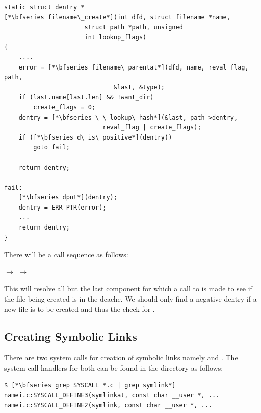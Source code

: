 \begin{lstlisting}
static struct dentry *
[*\bfseries filename\_create*](int dfd, struct filename *name,
                      struct path *path, unsigned 
                      int lookup_flags)
{    
    ....   
    error = [*\bfseries filename\_parentat*](dfd, name, reval_flag, path, 
                              &last, &type);
    if (last.name[last.len] && !want_dir)
        create_flags = 0;
    dentry = [*\bfseries \_\_lookup\_hash*](&last, path->dentry, 
                           reval_flag | create_flags);
    if ([*\bfseries d\_is\_positive*](dentry))
        goto fail;
        
    return dentry;

fail:
    [*\bfseries dput*](dentry);
    dentry = ERR_PTR(error);
    ...
    return dentry;
}
\end{lstlisting}

\noindent
There will be a call sequence as follows:

\small
\bigskip 
{} $\rightarrow$   $\rightarrow$ 
    
\bigskip
\normalsize
\noindent
This will resolve all but the last component for which a call to  is made to see if the file being created is in the dcache. We should only find a negative dentry if a new file is to be created and thus the check for .


\subsection{Creating Symbolic Links}\label{vfs-symlink}

There are two system calls for creation of symbolic links namely  and . The system call handlers for both can be found in the  directory as follows:

\begin{lstlisting}
$ [*\bfseries grep SYSCALL *.c | grep symlink*]
namei.c:SYSCALL_DEFINE3(symlinkat, const char __user *, ...
namei.c:SYSCALL_DEFINE2(symlink, const char __user *, ...
\end{lstlisting}

